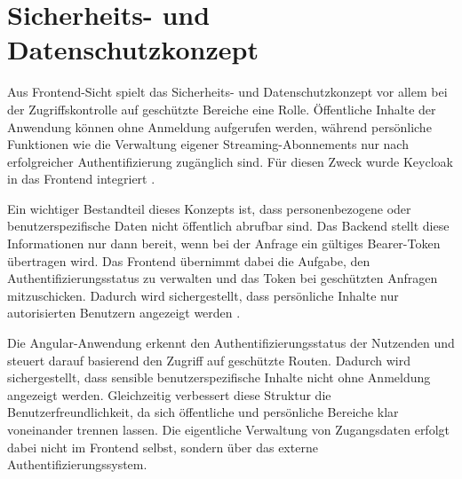 \section{Sicherheits- und Datenschutzkonzept}
Aus Frontend-Sicht spielt das Sicherheits- und Datenschutzkonzept vor allem bei der Zugriffskontrolle auf geschützte Bereiche eine Rolle. Öffentliche Inhalte der Anwendung können ohne Anmeldung aufgerufen werden, während persönliche Funktionen wie die Verwaltung eigener Streaming-Abonnements nur nach erfolgreicher Authentifizierung zugänglich sind. Für diesen Zweck wurde Keycloak in das Frontend integriert \cite{keycloak_docs,keycloak_home}.

Ein wichtiger Bestandteil dieses Konzepts ist, dass personenbezogene oder benutzerspezifische Daten nicht öffentlich abrufbar sind. Das Backend stellt diese Informationen nur dann bereit, wenn bei der Anfrage ein gültiges Bearer-Token übertragen wird. Das Frontend übernimmt dabei die Aufgabe, den Authentifizierungsstatus zu verwalten und das Token bei geschützten Anfragen mitzuschicken. Dadurch wird sichergestellt, dass persönliche Inhalte nur autorisierten Benutzern angezeigt werden \cite{keycloak_docs}.

Die Angular-Anwendung erkennt den Authentifizierungsstatus der Nutzenden und steuert darauf basierend den Zugriff auf geschützte Routen. Dadurch wird sichergestellt, dass sensible benutzerspezifische Inhalte nicht ohne Anmeldung angezeigt werden. Gleichzeitig verbessert diese Struktur die Benutzerfreundlichkeit, da sich öffentliche und persönliche Bereiche klar voneinander trennen lassen. Die eigentliche Verwaltung von Zugangsdaten erfolgt dabei nicht im Frontend selbst, sondern über das externe Authentifizierungssystem.





